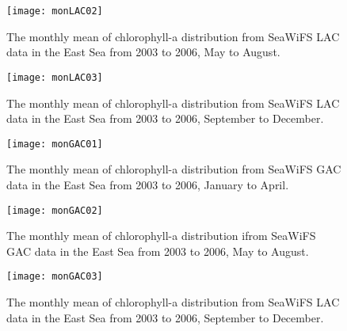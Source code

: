 \begin{figure}[h]
	\centering
	\texttt{[image: monLAC02]}\\
	\caption{The monthly mean of chlorophyll-a distribution from SeaWiFS LAC data in the East Sea from 2003 to 2006, May to August.}
	\label{fig:monLAC02}
\end{figure}

\begin{figure}[h]
	\centering
	\texttt{[image: monLAC03]}\\
	\caption{The monthly mean of chlorophyll-a distribution from SeaWiFS LAC data in the East Sea from 2003 to 2006, September to December.}
	\label{fig:monLAC03}
\end{figure}


\begin{figure}[h]
	\centering
	\texttt{[image: monGAC01]}\\
	\caption{The monthly mean of chlorophyll-a distribution from SeaWiFS GAC data in the East Sea from 2003 to 2006, January to April.}
	\label{fig:monGAC01}
\end{figure}


\begin{figure}[h]
	\centering
	\texttt{[image: monGAC02]}\\
	\caption{The monthly mean of chlorophyll-a distribution ifrom SeaWiFS GAC data in the East Sea from 2003 to 2006, May to August.}
	\label{fig:monGAC02}
\end{figure}


\begin{figure}[h]
	\centering
	\texttt{[image: monGAC03]}\\
	\caption{The monthly mean of chlorophyll-a distribution from SeaWiFS LAC data in the East Sea from 2003 to 2006, September to December.}
	\label{fig:monGAC03}
\end{figure}
